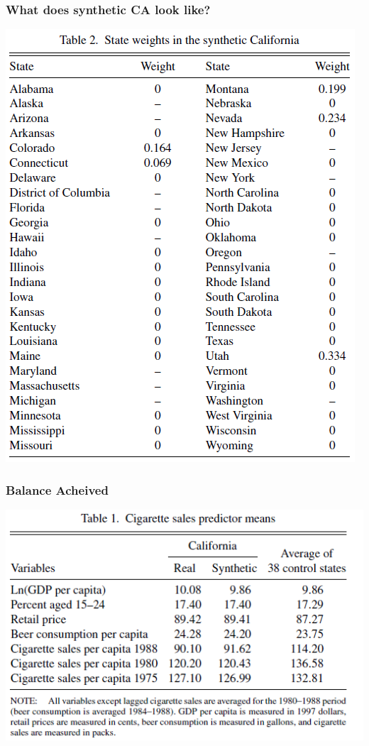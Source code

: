 \begin{frame}
  \frametitle{What does synthetic CA look like?}
  \vspace{-15pt}
  \begin{center}
    \includegraphics[height=.85\textheight]{./resources/ADHWeights}
  \end{center}  
\end{frame}

\begin{frame}
  \frametitle{Balance Acheived}
  \begin{center}
    \includegraphics[width=.9\textwidth]{./resources/ADHSumStats}
  \end{center}  
\end{frame}

